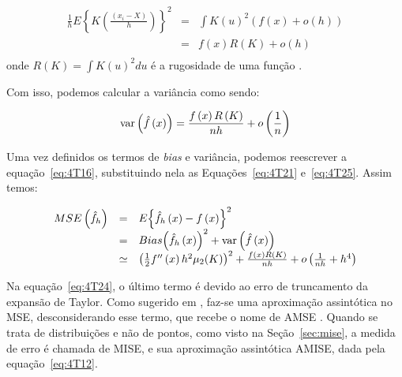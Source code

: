 \begin{equation}\label{eq:4T23}
\begin{array}{ccl}
 \frac{1}{h}E{\left\{ {K\left( {\frac{{({x_i} - X)}}{h}} \right)} \right\}^2} &=& \int {K{{\left( u \right)}^2}\left( {f\left( x \right) + o\left( h \right)} \right)}  \\
  &=& f\left( x \right)R\left( K \right) + o\left( h \right) \\
 \end{array}
 \end{equation}
onde $R\left( K \right) = \int {K{{\left( u \right)}^2}du}$ é a rugosidade de uma função \cite{scott2015multivariate}.

Com isso, podemos calcular a variância como sendo:

\begin{equation}\label{eq:4T25}
{\mathop{\rm var}} \left( {\hat f\left( x \right)} \right) = \frac{{f\left( x \right)R\left( K \right)}}{{nh}} + o\left( {\frac{1}{n}} \right)
\end{equation}

Uma vez definidos os termos de \emph{bias} e variância, podemos reescrever a equação~\ref{eq:4T16}, substituindo nela as Equações~\ref{eq:4T21} e~\ref{eq:4T25}. Assim temos:

\begin{equation}\label{eq:4T24}
\begin{array}{ccl}
 MSE\left( {{{\hat f}_h}} \right) &=& E{\left\{ {{{\hat f}_h}\left( x \right) - f\left( x \right)} \right\}^2} \\
  &=& Bias{\left( {{{\hat f}_h}\left( x \right)} \right)^2} + {\rm{var}}\left( {\hat f\left( x \right)} \right) \\
  &\simeq& {\left( {\frac{1}{2}f''\left( x \right){h^2}{\mu _2}(K)} \right)^2} + \frac{{f\left( x \right)R\left( K \right)}}{{nh}} + o\left( {\frac{1}{{nh}} + {h^4}} \right) \\
 \end{array}
\end{equation}

Na equação~\ref{eq:4T24}, o último termo é devido ao erro de truncamento da expansão de Taylor. Como sugerido em \cite{hansen2009lecture}, faz-se uma aproximação assintótica no MSE, desconsiderando esse termo, que recebe o nome de \ac{AMSE} . Quando se trata de distribuições e não de pontos, como visto na Seção~\ref{sec:mise}, a medida de erro é chamada de \ac{MISE}, e sua aproximação assintótica \ac{AMISE}, dada pela equação~\ref{eq:4T12}.

